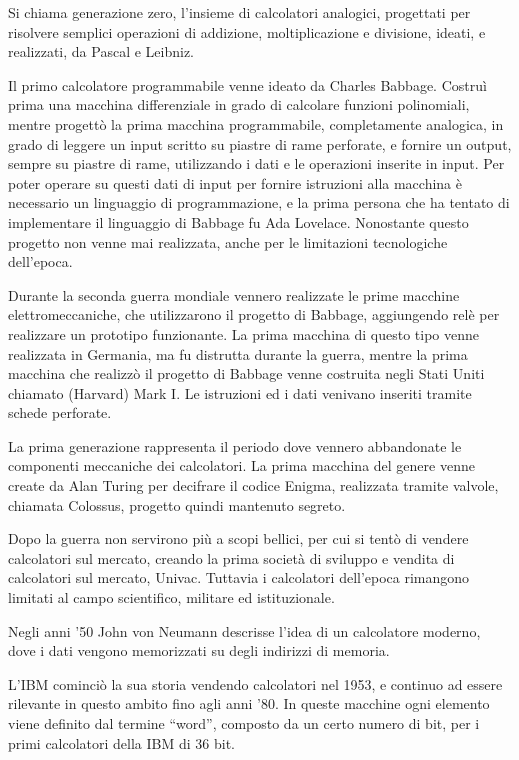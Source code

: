 \documentclass{article}
\numberwithin{equation}{subsection}
\begin{document}
Si chiama generazione zero, l'insieme di calcolatori analogici, progettati per risolvere semplici operazioni di addizione, moltiplicazione e divisione, ideati, e realizzati, da Pascal e Leibniz. 

Il primo calcolatore programmabile venne ideato da Charles Babbage. Costruì prima una macchina differenziale in grado di calcolare funzioni polinomiali, mentre progettò la 
prima macchina programmabile, completamente analogica, in grado di leggere un input scritto su piastre di rame perforate, e fornire un output, sempre su piastre di rame, utilizzando 
i dati e le operazioni inserite in input. Per poter operare su questi dati di input per fornire istruzioni alla macchina è necessario un linguaggio di programmazione, e la 
prima persona che ha tentato di implementare il linguaggio di Babbage fu Ada Lovelace. Nonostante questo progetto non venne mai realizzata, anche per le limitazioni tecnologiche dell'epoca. 


Durante la seconda guerra mondiale vennero realizzate le prime macchine elettromeccaniche, che utilizzarono il progetto di Babbage, aggiungendo relè per realizzare un prototipo funzionante. 
La prima macchina di questo tipo venne realizzata in Germania, ma fu distrutta durante la guerra, mentre la prima macchina che realizzò il progetto di Babbage venne costruita negli Stati Uniti chiamato 
(Harvard) Mark I. Le istruzioni ed i dati venivano inseriti tramite schede perforate. 


La prima generazione rappresenta il periodo dove vennero abbandonate le componenti meccaniche dei calcolatori. La prima macchina del genere venne create da Alan Turing per decifrare il codice Enigma, 
realizzata tramite valvole, chiamata Colossus, progetto quindi mantenuto segreto. 

Dopo la guerra non servirono più a scopi bellici, per cui si tentò di vendere calcolatori sul mercato, creando la prima società di sviluppo e vendita di calcolatori 
sul mercato, Univac. Tuttavia i calcolatori dell'epoca rimangono limitati al campo scientifico, militare ed istituzionale. 

Negli anni '50 John von Neumann descrisse l'idea di un calcolatore moderno, dove i dati vengono memorizzati su degli indirizzi di memoria. 

L'IBM cominciò la sua storia vendendo calcolatori nel 1953, e continuo ad essere rilevante in questo ambito fino agli anni '80. 
In queste macchine ogni elemento viene definito dal termine ``word'', composto da un certo numero di bit, per i primi calcolatori della IBM di 36 bit. 
\end{document}
